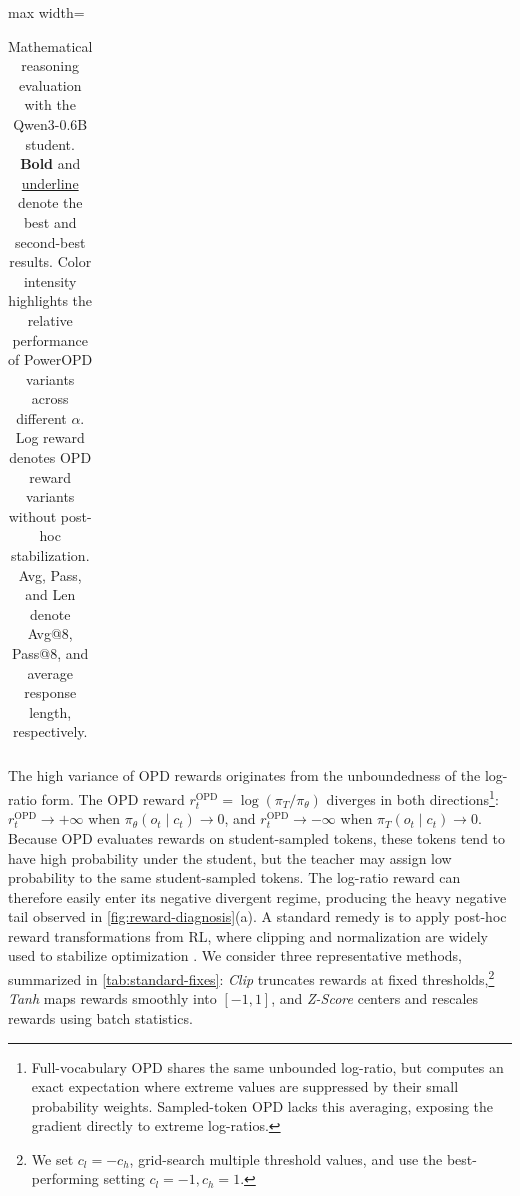 \begin{table}[t]
\begin{subtable}{\linewidth}
\begin{adjustbox}{max width=\linewidth}
\begin{tabular}{@{}ll lll@{\hskip 6pt}lll@{\hskip 6pt}lll@{\hskip 6pt}lll@{\hskip 6pt}lll@{\hskip 6pt}lll@{\hskip 6pt}lll@{\hskip 6pt}lll@{}}
\bottomrule
\end{tabular}
\end{adjustbox}
\end{subtable}

\vspace{-4pt}
\caption{
Mathematical reasoning evaluation with the Qwen3-0.6B student. \textbf{Bold} and \underline{underline} denote the best and second-best results. Color intensity highlights the relative performance of PowerOPD variants across different \(\alpha\). Log reward denotes OPD reward variants without post-hoc stabilization.
Avg, Pass, and Len denote Avg@8, Pass@8, and average response length, respectively.
}
\label{tab:main}
\end{table}

The high variance of OPD rewards originates from the unboundedness of the log-ratio form. The OPD reward \(r_t^{\mathrm{OPD}}=\log(\pi_T/\pi_\theta)\) diverges in both directions\footnote{Full-vocabulary OPD shares the same unbounded log-ratio, but 
computes an exact expectation where extreme values are suppressed by 
their small probability weights. Sampled-token OPD lacks this 
averaging, exposing the gradient directly to extreme log-ratios.}: \(r_t^{\mathrm{OPD}}\to +\infty\) when \(\pi_\theta(o_t\mid c_t)\to 0\), and \(r_t^{\mathrm{OPD}}\to -\infty\) when \(\pi_T(o_t\mid c_t)\to 0\). Because OPD evaluates rewards on student-sampled tokens, these tokens tend to have high probability under the student, but the teacher may assign low probability to the same student-sampled tokens. The log-ratio reward can therefore easily enter its negative divergent regime, producing the heavy negative tail observed in \autoref{fig:reward-diagnosis}(a).
A standard remedy is to apply post-hoc reward transformations from RL, where clipping and normalization are widely used to stabilize optimization \citep{mnih2015human,andrychowicz2020matters}. We consider three representative methods, summarized in \autoref{tab:standard-fixes}: \emph{Clip} truncates rewards at fixed thresholds,\footnote{We set \(c_l=-c_h\), grid-search multiple threshold values, and use the best-performing setting \(c_l=-1, c_h=1\).} \emph{Tanh} maps rewards smoothly into \([-1,1]\), and \emph{Z-Score} centers and rescales rewards using batch statistics. 

